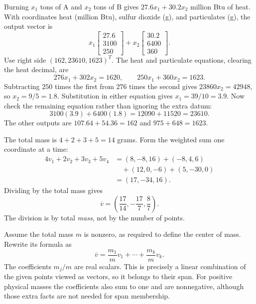 Burning $x_1$ tons of A and $x_2$ tons of B gives
$27.6x_1+30.2x_2$ million Btu of heat.
With coordinates heat (million Btu), sulfur dioxide (g), and particulates
(g), the output vector is
\[
x_1\begin{bmatrix}27.6\\3100\\250\end{bmatrix}
+x_2\begin{bmatrix}30.2\\6400\\360\end{bmatrix}.
\]
Use right side $(162,23610,1623)^T$. The heat and particulate
equations, clearing the heat decimal, are
\[
276x_1+302x_2=1620,\qquad250x_1+360x_2=1623.
\]
Subtracting $250$ times the first from $276$ times the second gives
$23860x_2=42948$, so $x_2=9/5=1.8$.
Substitution in either equation gives $x_1=39/10=3.9$.
Now check the remaining equation rather than ignoring the extra datum:
\[
3100(3.9)+6400(1.8)=12090+11520=23610.
\]
The other outputs are $107.64+54.36=162$ and $975+648=1623$.

The total mass is $4+2+3+5=14$ grams. Form the weighted sum one
coordinate at a time:
\[
\begin{aligned}
4v_1+2v_2+3v_3+5v_4
&=(8,-8,16)+(-8,4,6)\\
&\quad +(12,0,-6)+(5,-30,0)\\
&=(17,-34,16).
\end{aligned}
\]
Dividing by the total mass gives
\[
\overline v=\left(\frac{17}{14},-\frac{17}{7},\frac87\right).
\]
The division is by total \emph{mass}, not by the number of points.

Assume the total mass $m$ is nonzero, as required to define the
center of mass. Rewrite its formula as
\[
\overline v=\frac{m_1}{m}v_1+\cdots+\frac{m_k}{m}v_k.
\]
The coefficients $m_j/m$ are real scalars. This is precisely a linear
combination of the given points viewed as vectors, so it belongs to
their span. For positive physical masses the coefficients also sum to
one and are nonnegative, although those extra facts are not needed
for span membership.

